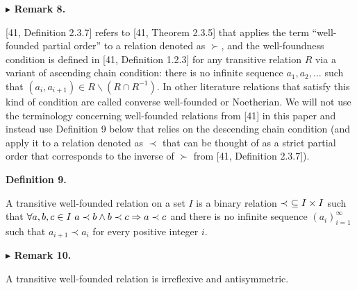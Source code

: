  
 
\par\medskip\noindent\textbf{$\blacktriangleright$ Remark 8.}\par
 
 
[41, Definition 2.3.7] refers to [41, Theorem 2.3.5] that applies the term “well-founded partial order” to a relation denoted as $\succ$, and the well-foundness condition is defined in [41, Definition 1.2.3] for any transitive relation $R$ via a variant of ascending chain condition: there is no infinite sequence $a_{1},a_{2},...$ such that $(a_{i},a_{i+1})\in R\backslash(R\cap R^{-1})$. In other literature relations that satisfy this kind of condition are called converse well-founded or Noetherian. We will not use the terminology concerning well-founded relations from [41] in this paper and instead use Definition 9 below that relies on the descending chain condition (and apply it to a relation denoted as $\prec$ that can be thought of as a strict partial order that corresponds to the inverse of $\succ$ from [41, Definition 2.3.7]).\par
 
 
 
 
\par\medskip\noindent\textbf{Definition 9.}\par
 
 
A transitive well-founded relation on a set $I$ is a binary relation $\prec\leavevmode\nobreak\ \subseteq I\times I$ such that $\forall a,b,c\in I\leavevmode\nobreak\ a\prec b\wedge b\prec c\Rightarrow a\prec
c$ and there is no infinite sequence $(a_{i})_{i=1}^{\infty}$ such that $a_{i+1}\prec a_{i}$ for every positive integer $i$.\par
 
 
 
 
\par\medskip\noindent\textbf{$\blacktriangleright$ Remark 10.}\par
 
 
A transitive well-founded relation is irreflexive and antisymmetric.\par
 
